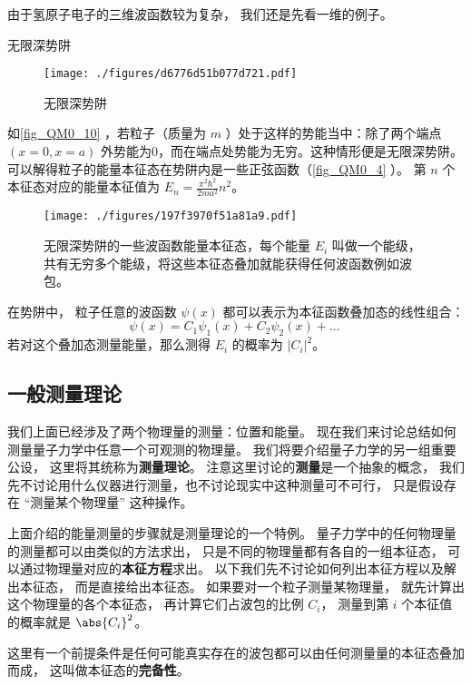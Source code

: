 由于氢原子电子的三维波函数较为复杂， 我们还是先看一维的例子。

\begin{example}{无限深势阱}
\begin{figure}[ht]
\centering
\texttt{[image: ./figures/d6776d51b077d721.pdf]}
\caption{无限深势阱} \label{fig_QM0_10}
\end{figure}
如\autoref{fig_QM0_10} ，若粒子（质量为 $m$ ）处于这样的势能当中：除了两个端点 $(x=0,x=a)$ 外势能为0，而在端点处势能为无穷。这种情形便是无限深势阱。 可以解得粒子的能量本征态在势阱内是一些正弦函数（\autoref{fig_QM0_4} ）。 第 $n$ 个本征态对应的能量本征值为 $E_n=\frac{\pi^2\hbar^2}{2ma^2}n^2$。

\begin{figure}[ht]
\centering
\texttt{[image: ./figures/197f3970f51a81a9.pdf]}
\caption{无限深势阱的一些波函数能量本征态，每个能量 $E_i$ 叫做一个能级，共有无穷多个能级，将这些本征态叠加就能获得任何波函数例如波包。} \label{fig_QM0_4}
\end{figure}

在势阱中， 粒子任意的波函数 $\psi(x)$ 都可以表示为本征函数叠加态的线性组合：
\begin{equation}
\psi(x) = C_1\psi_1(x) + C_2\psi_2(x) + \dots~
\end{equation}
若对这个叠加态测量能量，那么测得 $E_i$ 的概率为 $|C_i|^2$。
\end{example}


\subsection{一般测量理论}
我们上面已经涉及了两个物理量的测量：位置和能量。 现在我们来讨论总结如何测量量子力学中任意一个可观测的物理量。 我们将要介绍量子力学的另一组重要公设， 这里将其统称为\textbf{测量理论}。 注意这里讨论的\textbf{测量}是一个抽象的概念， 我们先不讨论用什么仪器进行测量，也不讨论现实中这种测量可不可行， 只是假设存在 “测量某个物理量” 这种操作。

上面介绍的能量测量的步骤就是测量理论的一个特例。 量子力学中的任何物理量的测量都可以由类似的方法求出， 只是不同的物理量都有各自的一组本征态， 可以通过物理量对应的\textbf{本征方程}求出。 以下我们先不讨论如何列出本征方程以及解出本征态， 而是直接给出本征态。 如果要对一个粒子测量某物理量， 就先计算出这个物理量的各个本征态， 再计算它们占波包的比例 $C_i$， 测量到第 $i$ 个本征值的概率就是 $\abs{C_i}^2$。

这里有一个前提条件是任何可能真实存在的波包都可以由任何测量量的本征态叠加而成， 这叫做本征态的\textbf{完备性}。


